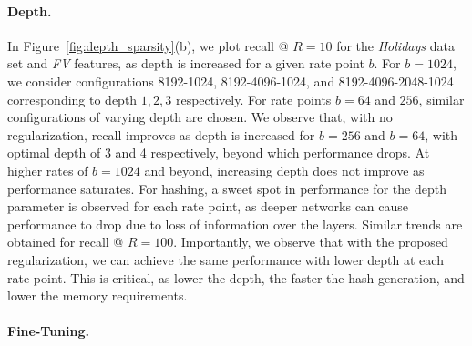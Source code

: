 \documentclass[10pt,twocolumn,letterpaper]{article}
\begin{document}
\paragraph{Depth.}
In Figure~\ref{fig:depth_sparsity}(b), we plot recall @ $R=10$ for the {\it Holidays} data set and {\it FV} features, as depth is increased for a given rate point $b$.
For $b=1024$, we consider configurations 8192-1024, 8192-4096-1024, and 8192-4096-2048-1024 corresponding to depth $1,2,3$ respectively. 
For rate points $b=64$ and $256$, similar configurations of varying depth are chosen.
We observe that, with no regularization, recall improves as depth is increased for $b=256$ and $b=64$, with optimal depth of 3 and 4 respectively, beyond which performance drops.
At higher rates of $b=1024$ and beyond, increasing depth does not improve as performance saturates.
For hashing, a sweet spot in performance for the depth parameter is observed for each rate point, as deeper networks can cause performance to drop due to loss of information over the layers.
Similar trends are obtained for recall @ $R=100$.
Importantly, we observe that with the proposed regularization, we can achieve the same performance with lower depth at each rate point.
This is critical, as lower the depth, the faster the hash generation, and lower the memory requirements.

\vspace{-0.1em}
\paragraph{Fine-Tuning.}
\end{document}
